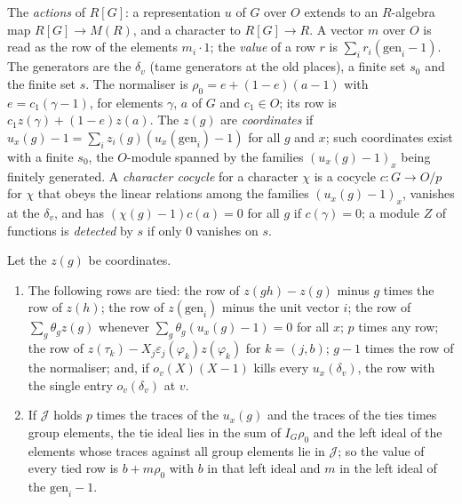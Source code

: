 The \emph{actions} of $R[G]$: a representation $u$ of $G$ over $O$ extends to an $R$-algebra map $R[G]\to M(R)$, and a character to $R[G]\to R$. A vector $m$ over $O$ is read as the row of the elements $m_i\cdot1$; the \emph{value} of a row $r$
is $\sum_ir_i(\mathrm{gen}_i-1)$. The generators are the $\delta_v$ (tame generators at the old places), a finite set $s_0$ and the finite set $s$. The normaliser is $\rho_0=e+(1-e)(a-1)$ with $e=c_1(\gamma-1)$, for elements $\gamma$, $a$ of $G$ and
$c_1\in O$; its row is $c_1z(\gamma)+(1-e)z(a)$. The $z(g)$ are \emph{coordinates} if $u_x(g)-1=\sum_iz_i(g)(u_x(\mathrm{gen}_i)-1)$ for all $g$ and $x$; such coordinates exist with a finite $s_0$, the $O$-module spanned by the families
$(u_x(g)-1)_x$ being finitely generated. A \emph{character cocycle} for a character $\chi$ is a cocycle $c\colon G\to O/p$ for $\chi$ that obeys the linear relations among the families $(u_x(g)-1)_x$, vanishes at the $\delta_v$, and has
$(\chi(g)-1)c(a)=0$ for all $g$ if $c(\gamma)=0$; a module $Z$ of functions is \emph{detected} by $s$ if only $0$ vanishes on $s$.

\begin{lemma}\label{lem:tied-relations}
Let the $z(g)$ be coordinates.
\begin{enumerate}[label=\textup{(\alph*)}]
\item The following rows are tied: the row of $z(gh)-z(g)$ minus $g$ times the row of $z(h)$; the row of $z(\mathrm{gen}_i)$ minus the unit vector $i$; the row of $\sum_g\theta_gz(g)$ whenever $\sum_g\theta_g(u_x(g)-1)=0$ for all $x$; $p$ times any
row; the row of $z(\tau_k)-X_j\varepsilon_j(\varphi_k)z(\varphi_k)$ for $k=(j,b)$; $g-1$ times the row of the normaliser; and, if $o_v(X)(X-1)$ kills every $u_x(\delta_v)$, the row with the single entry $o_v(\delta_v)$ at $v$.
\item If $\mathcal J$ holds $p$ times the traces of the $u_x(g)$ and the traces of the ties times group elements, the tie ideal lies in the sum of $I_G\rho_0$ and the left ideal of the elements whose traces against all group elements lie
in $\mathcal J$; so the value of every tied row is $b+m\rho_0$ with $b$ in that left ideal and $m$ in the left ideal of the $\mathrm{gen}_i-1$.
\end{enumerate}
\end{lemma}

